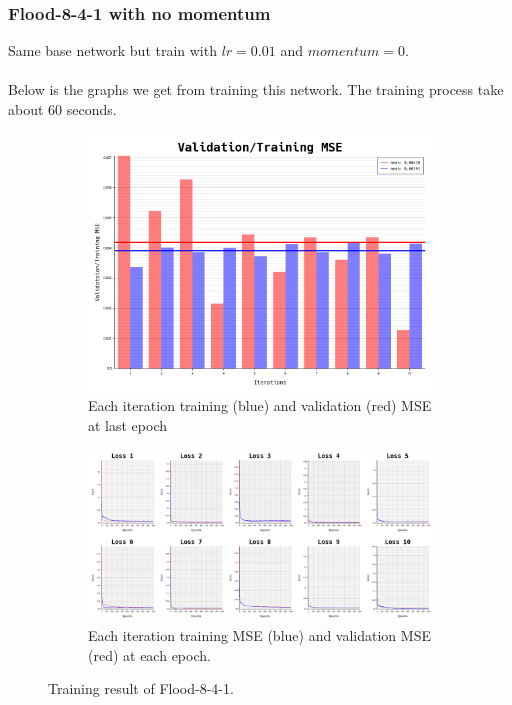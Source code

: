 \documentclass{article}
\begin{document}
\newpage
\subsubsection*{Flood-8-4-1 with no momentum}
Same base network but train with $lr = 0.01$ and $momentum = 0$.
\\ \\
Below is the graphs we get from training this network. The training process take about $60$ seconds.
\begin{figure}[ht]
	\begin{subfigure}{\textwidth}
		\centering
		\includegraphics[scale=0.3]{flood-8-4-1_2/cv_l}
		\caption{Each iteration training (blue) and validation (red) MSE at last epoch}
	\end{subfigure}
	\begin{subfigure}{\textwidth}
		\includegraphics[width=\textwidth]{flood-8-4-1_2/loss}
		\caption{Each iteration training MSE (blue) and validation MSE (red) at each epoch.}
	\end{subfigure}
	\caption{Training result of Flood-8-4-1.}
	\label{fig:3}
\end{figure}
\FloatBarrier
\end{document}
